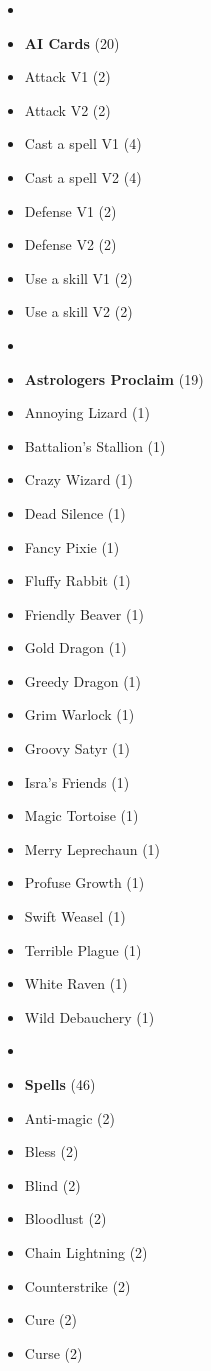 \begin{multicols*}{3}
\begin{itemize}[leftmargin=0pt, label={}, noitemsep]
  \item
  \item \textbf{AI Cards} (20)
  \item Attack V1 (2)
  \item Attack V2 (2)
  \item Cast a spell V1 (4)
  \item Cast a spell V2 (4)
  \item Defense V1 (2)
  \item Defense V2 (2)
  \item Use a skill V1 (2)
  \item Use a skill V2 (2)
  \item
  \item \textbf{Astrologers Proclaim} (19)
  \item Annoying Lizard (1)
  \item Battalion's Stallion (1)
  \item Crazy Wizard (1)
  \item Dead Silence (1)
  \item Fancy Pixie (1)
  \item Fluffy Rabbit (1)
  \item Friendly Beaver (1)
  \item Gold Dragon (1)
  \item Greedy Dragon (1)
  \item Grim Warlock (1)
  \item Groovy Satyr (1)
  \item Isra's Friends (1)
  \item Magic Tortoise (1)
  \item Merry Leprechaun (1)
  \item Profuse Growth (1)
  \item Swift Weasel (1)
  \item Terrible Plague (1)
  \item White Raven (1)
  \item Wild Debauchery (1)
  \item
  \item \textbf{Spells} (46)
  \item Anti-magic (2)
  \item Bless (2)
  \item Blind (2)
  \item Bloodlust (2)
  \item Chain Lightning (2)
  \item Counterstrike (2)
  \item Cure (2)
  \item Curse (2)

\end{itemize}
\end{multicols*}
